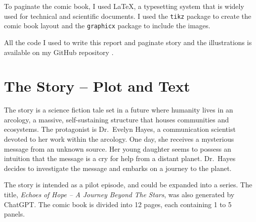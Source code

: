 \documentclass[a4paper,11pt]{article}
\begin{document}
To paginate the comic book, I used \LaTeX, a typesetting system that is widely used for technical and scientific documents. I used the \texttt{tikz} package to create the comic book layout and the \texttt{graphicx} package to include the images.

All the code I used to write this report and paginate story and the illustrations is available on my GitHub repository \cite{github}.



\section{The Story -- Plot and Text}

The story is a science fiction tale set in a future where humanity lives in an arcology, a massive, self-sustaining structure that houses communities and ecosystems. The protagonist is Dr.~Evelyn Hayes, a communication scientist devoted to her work within the arcology. One day, she receives a mysterious message from an unknown source. Her young daughter seems to possess an intuition that the message is a cry for help from a distant planet. Dr.~Hayes decides to investigate the message and embarks on a journey to the planet. 

The story is intended as a pilot episode, and could be expanded into a series. The title, \emph{Echoes of Hope -- A Journey Beyond The Stars}, was also generated by ChatGPT. The comic book is divided into 12 pages, each containing 1 to 5 panels.
\end{document}
